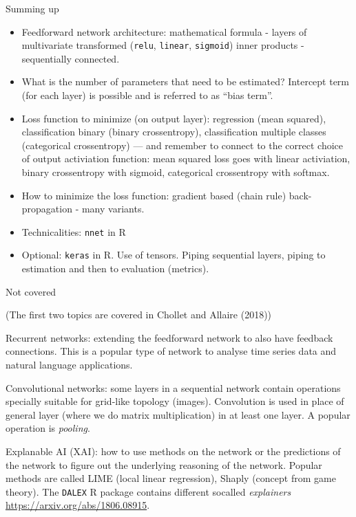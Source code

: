 \documentclass[10pt,ignorenonframetext,]{beamer}
\providecommand{\tightlist}{%
  \setlength{\itemsep}{0pt}\setlength{\parskip}{0pt}}
\begin{document}
\begin{frame}[fragile]{Summing up}
\protect\hypertarget{summing-up-1}{}

\begin{itemize}
\tightlist
\item
  Feedforward network architecture: mathematical formula - layers of
  multivariate transformed (\texttt{relu}, \texttt{linear},
  \texttt{sigmoid}) inner products - sequentially connected.
\item
  What is the number of parameters that need to be estimated? Intercept
  term (for each layer) is possible and is referred to as ``bias term''.
\item
  Loss function to minimize (on output layer): regression (mean
  squared), classification binary (binary crossentropy), classification
  multiple classes (categorical crossentropy) --- and remember to
  connect to the correct choice of output activiation function: mean
  squared loss goes with linear activiation, binary crossentropy with
  sigmoid, categorical crossentropy with softmax.
\item
  How to minimize the loss function: gradient based (chain rule)
  back-propagation - many variants.
\item
  Technicalities: \texttt{nnet} in R
\item
  Optional: \texttt{keras} in R. Use of tensors. Piping sequential
  layers, piping to estimation and then to evaluation (metrics).
\end{itemize}

\end{frame}

\begin{frame}[fragile]

\begin{block}{Not covered}

(The first two topics are covered in Chollet and Allaire (2018))

Recurrent networks: extending the feedforward network to also have
feedback connections. This is a popular type of network to analyse time
series data and natural language applications.

Convolutional networks: some layers in a sequential network contain
operations specially suitable for grid-like topology (images).
Convolution is used in place of general layer (where we do matrix
multiplication) in at least one layer. A popular operation is
\emph{pooling}.

Explanable AI (XAI): how to use methods on the network or the
predictions of the network to figure out the underlying reasoning of the
network. Popular methods are called LIME (local linear regression),
Shaply (concept from game theory). The \texttt{DALEX} R package contains
different socalled \emph{explainers}
\url{https://arxiv.org/abs/1806.08915}.

\end{block}

\end{frame}
\end{document}
